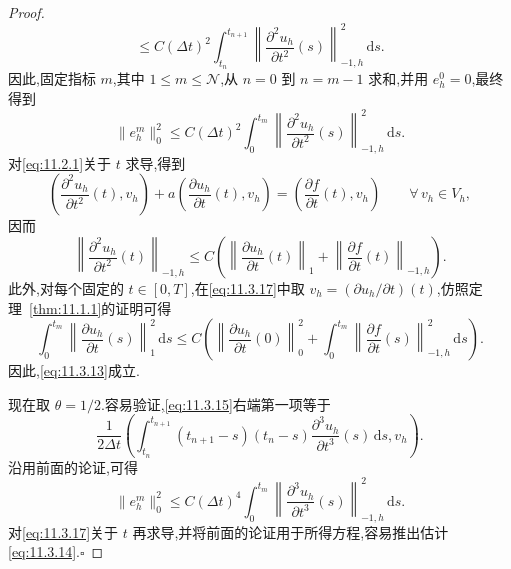 \begin{proof}
\[       \le C(\Delta t)^2\int_{t_n}^{t_{n+1}}
                  \left\|\frac{\partial^2u_h}{\partial t^2}(s)\right\|_{-1,h}^2\,\mathrm ds.
\]
因此,固定指标 \(m\),其中 \(1\le m\le\mathcal N\),从 \(n=0\) 到 \(n=m-1\) 求和,并用 \(e_h^0=0\),最终得到
\[
  \|e_h^m\|_0^2\le C(\Delta t)^2\int_0^{t_m}
                 \left\|\frac{\partial^2u_h}{\partial t^2}(s)\right\|_{-1,h}^2\,\mathrm ds.
\]
对\eqref{eq:11.2.1}关于 \(t\) 求导,得到
\begin{equation}\label{eq:11.3.17}
  \left(\frac{\partial^2u_h}{\partial t^2}(t),v_h\right)
       +a\left(\frac{\partial u_h}{\partial t}(t),v_h\right)
       =\left(\frac{\partial f}{\partial t}(t),v_h\right)\qquad\forall\,v_h\in V_h,
\end{equation}
因而
\[
  \left\|\frac{\partial^2u_h}{\partial t^2}(t)\right\|_{-1,h}
     \le C\left(\left\|\frac{\partial u_h}{\partial t}(t)\right\|_1
                   +\left\|\frac{\partial f}{\partial t}(t)\right\|_{-1,h}\right).
\]
此外,对每个固定的 \(t\in[0,T]\),在\eqref{eq:11.3.17}中取 \(v_h=(\partial u_h/\partial t)(t)\),仿照定理~\ref{thm:11.1.1}的证明可得
\[
  \int_0^{t_m}\left\|\frac{\partial u_h}{\partial t}(s)\right\|_1^2\,\mathrm ds
      \le C\left(\left\|\frac{\partial u_h}{\partial t}(0)\right\|_0^2
                +\int_0^{t_m}\left\|\frac{\partial f}{\partial t}(s)\right\|_{-1,h}^2\,\mathrm ds\right).
\]
因此,\eqref{eq:11.3.13}成立.

现在取 \(\theta=1/2\).容易验证,\eqref{eq:11.3.15}右端第一项等于
\[
  \frac1{2\Delta t}\left(\int_{t_n}^{t_{n+1}}(t_{n+1}-s)(t_n-s)
           \frac{\partial^3u_h}{\partial t^3}(s)\,\mathrm ds,v_h\right).
\]
沿用前面的论证,可得
\[
  \|e_h^m\|_0^2\le C(\Delta t)^4\int_0^{t_m}
                  \left\|\frac{\partial^3u_h}{\partial t^3}(s)\right\|_{-1,h}^2\,\mathrm ds.
\]
对\eqref{eq:11.3.17}关于 \(t\) 再求导,并将前面的论证用于所得方程,容易推出估计\eqref{eq:11.3.14}.\hfill\(\square\)
\end{proof}

